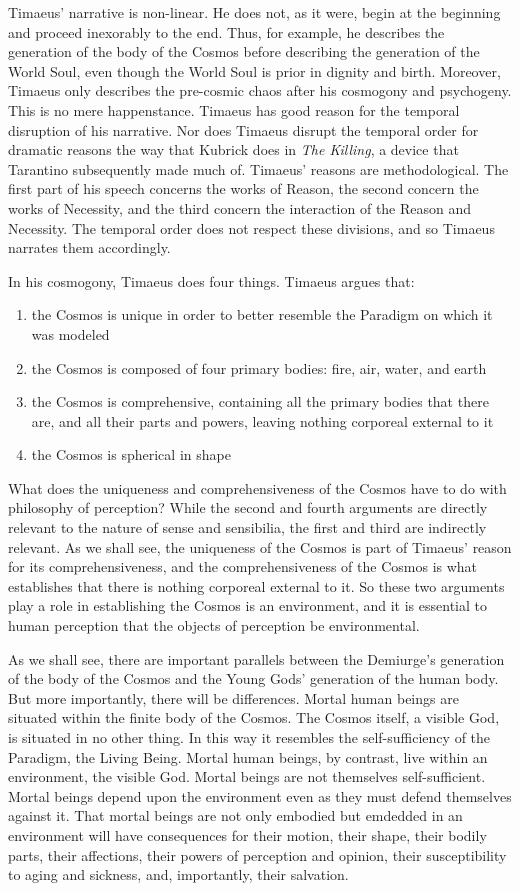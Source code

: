 Timaeus' narrative is non-linear. He does not, as it were, begin at the beginning and proceed inexorably to the end. Thus, for example, he describes the generation of the body of the Cosmos before describing the generation of the World Soul, even though the World Soul is prior in dignity and birth. Moreover, Timaeus only describes the pre-cosmic chaos after his cosmogony and psychogeny. This is no mere happenstance. Timaeus has good reason for the temporal disruption of his narrative. Nor does Timaeus disrupt the temporal order for dramatic reasons the way that Kubrick does in \emph{The Killing}, a device that Tarantino subsequently made much of. Timaeus' reasons are methodological. The first part of his speech concerns the works of Reason, the second concern the works of Necessity, and the third concern the interaction of the Reason and Necessity. The temporal order does not respect these divisions, and so Timaeus narrates them accordingly.

In his cosmogony, Timaeus does four things. Timaeus argues that:
\begin{enumerate}[(1)]
	\item the Cosmos is unique in order to better resemble the Paradigm on which it was modeled
	\item the Cosmos is composed of four primary bodies: fire, air, water, and earth
	\item the Cosmos is comprehensive, containing all the primary bodies that there are, and all their parts and powers, leaving nothing corporeal external to it
	\item the Cosmos is spherical in shape
\end{enumerate}
What does the uniqueness and comprehensiveness of the Cosmos have to do with philosophy of perception? While the second and fourth arguments are directly relevant to the nature of sense and sensibilia, the first and third are indirectly relevant. As we shall see, the uniqueness of the Cosmos is part of Timaeus' reason for its comprehensiveness, and the comprehensiveness of the Cosmos is what establishes that there is nothing corporeal external to it. So these two arguments play a role in establishing the Cosmos is an environment, and it is essential to human perception that the objects of perception be environmental.

As we shall see, there are important parallels between the Demiurge's generation of the body of the Cosmos and the Young Gods' generation of the human body. But more importantly, there will be differences. Mortal human beings are situated within the finite body of the Cosmos. The Cosmos itself, a visible God, is situated in no other thing. In this way it resembles the self-sufficiency of the Paradigm, the Living Being. Mortal human beings, by contrast, live within an environment, the visible God. Mortal beings are not themselves self-sufficient. Mortal beings depend upon the environment even as they must defend themselves against it. That mortal beings are not only embodied but emdedded in an environment will have consequences for their motion, their shape, their bodily parts, their affections, their powers of perception and opinion, their susceptibility to aging and sickness, and, importantly, their salvation.

